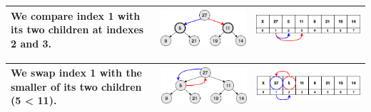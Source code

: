 \begin{center}
	\begin{table}
		\begin{tabular}{| p{}|M{0.30\textwidth}|M{0.35\textwidth}|}
			\hline
			\scriptsize{We compare index 1 with its two children at indexes 2 and 3. }
			  &   
			\includegraphics[scale=.30]{images/heapify_tree_08.png}
			  &   
			\includegraphics[scale=.30]{images/heapify_08.png}\\
			\hline
		\end{tabular}
	\end{table}
\end{center}


\begin{center}
	\begin{table}
		\begin{tabular}{| p{}|M{0.30\textwidth}|M{0.35\textwidth}|}
			\hline
			\scriptsize{We swap index 1 with the smaller of its two children (5 < 11).}
			  &   
			\includegraphics[scale=.30]{images/heapify_tree_09.png}
			  &   
			\includegraphics[scale=.30]{images/heapify_09.png}\\
			\hline
		\end{tabular}
	\end{table}
\end{center}


